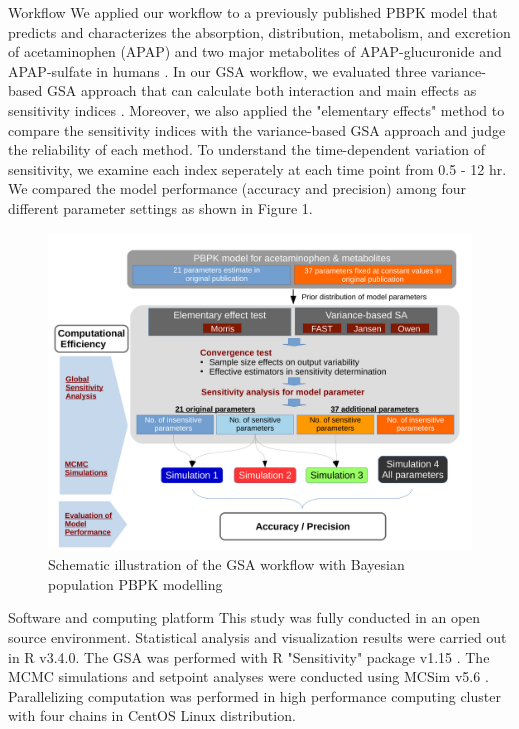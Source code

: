 \documentclass[xcolor=table]{beamer}
\begin{document}
\begin{frame}[t]
\begin{columns}[t]
\begin{column}{0.25\paperwidth}

\begin{alertblock}{Workflow}
We applied our workflow to a previously published PBPK model that predicts and characterizes the absorption, distribution, metabolism, and excretion of acetaminophen (APAP) and two major metabolites of APAP-glucuronide and APAP-sulfate in humans \cite{Zurlinden}.
In our GSA workflow, we evaluated three variance-based GSA approach that can calculate both interaction and main effects as sensitivity indices \cite{McNally, Jansen, Owen}.
Moreover, we also applied the "elementary effects" method to compare the sensitivity indices with the variance-based GSA approach and judge the reliability of each method. 
To understand the time-dependent variation of sensitivity, we examine each index seperately at each time point from 0.5 - 12 hr.
We compared the model performance (accuracy and precision) among four different parameter settings as shown in Figure 1.

\begin{figure}
\includegraphics[width=0.9\linewidth]{fig0.pdf}
\caption{Schematic illustration of the GSA workflow with Bayesian population PBPK modelling}
\end{figure}

\end{alertblock}

\begin{alertblock}{Software and computing platform}
This study was fully conducted in an open source environment. 
Statistical analysis and visualization results were carried out in R v3.4.0.
The GSA was performed with R "Sensitivity" package v1.15 \cite{Pujol17}. 
The MCMC simulations and setpoint analyses were conducted using MCSim v5.6 \cite{Bois09}.
Parallelizing computation was performed in high performance computing cluster with four chains in CentOS Linux distribution.


\end{alertblock}
\end{column}
\end{columns}
\end{frame}
\end{document}
